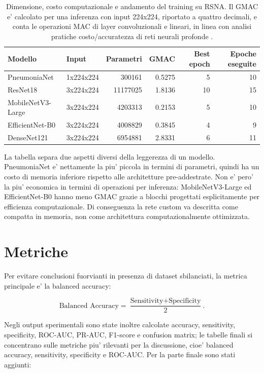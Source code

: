\documentclass[11pt,a4paper]{article}
\newcommand{\balacc}{balanced accuracy}
\begin{document}
\begin{table}[H]
\centering
\caption{Dimensione, costo computazionale e andamento del training su RSNA. Il GMAC e' calcolato per una inferenza con input 224x224, riportato a quattro decimali, e conta le operazioni MAC di layer convoluzionali e lineari, in linea con analisi pratiche costo/accuratezza di reti neurali profonde \cite{canziani2016analysis}.}
\begin{tabular}{llrrrr}
\toprule
Modello & Input & Parametri & GMAC & Best epoch & Epoche eseguite \\
\midrule
PneumoniaNet & 1x224x224 & 300161 & 0.5275 & 5 & 10 \\
ResNet18 & 3x224x224 & 11177025 & 1.8136 & 10 & 15 \\
MobileNetV3-Large & 3x224x224 & 4203313 & 0.2153 & 5 & 10 \\
EfficientNet-B0 & 3x224x224 & 4008829 & 0.3845 & 4 & 9 \\
DenseNet121 & 3x224x224 & 6954881 & 2.8331 & 6 & 11 \\
\bottomrule
\end{tabular}
\end{table}

La tabella separa due aspetti diversi della leggerezza di un modello.
PneumoniaNet e' nettamente la piu' piccola in termini di parametri, quindi ha
un costo di memoria inferiore rispetto alle architetture pre-addestrate. Non e'
pero' la piu' economica in termini di operazioni per inferenza: MobileNetV3-Large
ed EfficientNet-B0 hanno meno GMAC grazie a blocchi progettati esplicitamente
per efficienza computazionale. Di conseguenza la rete custom va descritta come
compatta in memoria, non come architettura computazionalmente ottimizzata.

\section{Metriche}

Per evitare conclusioni fuorvianti in presenza di dataset sbilanciati, la
metrica principale e' la \balacc:

\[
\text{Balanced Accuracy} =
\frac{\text{Sensitivity} + \text{Specificity}}{2}.
\]

Negli output sperimentali sono state inoltre calcolate accuracy, sensitivity,
specificity, ROC-AUC, PR-AUC, F1-score e confusion matrix; le tabelle finali si
concentrano sulle metriche piu' rilevanti per la discussione, cioe' \balacc{},
sensitivity, specificity e ROC-AUC. Per la parte finale sono stati aggiunti:
\end{document}
